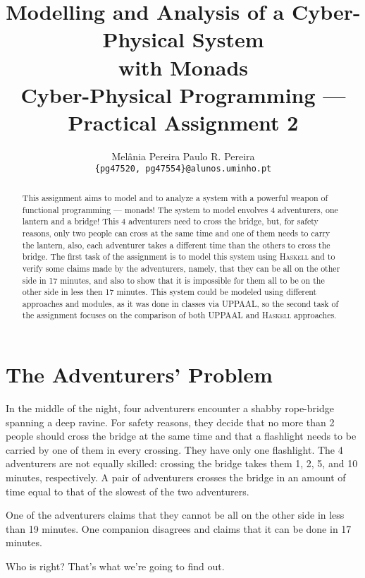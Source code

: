 \documentclass[a4paper]{article}
\title{\bfseries Modelling and Analysis of a Cyber-Physical System\\ with Monads \\ {\Large Cyber-Physical Programming --- Practical Assignment 2}}
\author{
    Melânia Pereira \quad \quad Paulo R. Pereira\\
    \texttt{\{pg47520, pg47554\}@alunos.uminho.pt}
}
\begin{document}
\raggedbottom
{}

\maketitle

\begin{abstract}
This assignment aims to model and to analyze a system with a powerful weapon of functional programming --- monads! The system to model envolves 4 adventurers, one lantern and a bridge! This 4 adventurers need to cross the bridge, but, for safety reasons, only two people can cross at the same time and one of them needs to carry the lantern, also, each adventurer takes a different time than the others to cross the bridge. The first task of the assignment is to model this system using \textsc{Haskell} and to verify some claims made by the adventurers, namely, that they can be all on the other side in 17 minutes, and also to show that it is impossible for them all to be on the other side in less then 17 minutes. This system could be modeled using different approaches and modules, as it was done in classes via UPPAAL, so the second task of the assignment focuses on the comparison of both UPPAAL and \textsc{Haskell} approaches.
\end{abstract}


\section{The Adventurers' Problem}
In the middle of the night, four adventurers encounter a shabby rope-bridge spanning a deep ravine.
For safety reasons, they decide that no more than 2 people should cross the bridge at the same
time and that a flashlight needs to be carried by one of them in every crossing. They have only
one flashlight. The 4 adventurers are not equally skilled: crossing the bridge takes them 1, 2, 5,
and 10 minutes, respectively. A pair of adventurers crosses the bridge in an amount of time equal
to that of the slowest of the two adventurers.

One of the adventurers claims that they cannot be all on the other side in less than 19 minutes.
One companion disagrees and claims that it can be done in 17 minutes.

Who is right? That's what we're going to find out.
\end{document}
